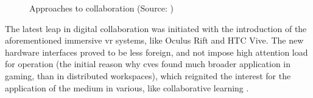 \begin{figure}
	\centering
	\hfill
	\hfill
	\hfill
	\caption{Approaches to collaboration (Source: \cite{churchill_collaborative_1998})}
	\label{fig:approaches_to_collaboration}
\end{figure}

The latest leap in digital collaboration was initiated with the introduction of the aforementioned immersive \gls{vr} systems, like Oculus Rift and HTC Vive. The new hardware interfaces proved to be less foreign, and not impose high attention load for operation (the initial reason why \gls{cve}s found much broader application in gaming, than in distributed workspaces), which reignited the interest for the application of the medium in various, like collaborative learning \cite{greenwald_cocoverse_nodate}. 

